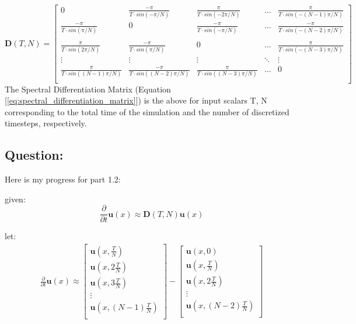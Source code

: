 \documentclass{article}
\begin{document}
\begin{equation}
    \textbf{D}(T,N) = \begin{bmatrix}
       0 & \frac{-\pi}{T \cdot sin(-\pi/ N)} & \frac{\pi}{T \cdot sin(-2\pi/ N)} & \hdots & \frac{\pi}{T \cdot sin(-(N-1)\pi/ N)}\\
       \frac{-\pi}{T \cdot sin(\pi/ N)} & 0 & \frac{-\pi}{T \cdot sin(-\pi/ N)} & \hdots & \frac{-\pi}{T \cdot sin(-(N-2)\pi/ N)}\\\\
       \frac{\pi}{T \cdot sin(2\pi/ N)} & \frac{-\pi}{T \cdot sin(\pi/ N)} & 0 & \hdots & \frac{\pi}{T \cdot sin(-(N-3)\pi/ N)} \\
       \vdots & \vdots & \vdots & \ddots & \vdots \\
       \frac{\pi}{T \cdot sin((N-1)\pi/ N)} & \frac{-\pi}{T \cdot sin((N-2)\pi/ N)} & \frac{\pi}{T \cdot sin((N-3)\pi/ N)} & \hdots & 0\\
   \end{bmatrix}
   \label{eq:spectral_differentiation_matrix}
\end{equation}
The Spectral Differentiation Matrix (Equation [\ref{eq:spectral_differentiation_matrix}]) is the above for input scalars T, N corresponding to the total time of the simulation and the number of discretized timesteps, respectively.

\subsection{Question:}

Here is my progress for part 1.2:  

given:
$$\frac{\partial}{\partial t}\textbf{u}(x) \approx \textbf{D}(T,N)\textbf{u}(x)$$

let:
\begin{align*}
\frac{\partial}{\partial t}\textbf{u}(x)
\approx \begin{bmatrix}
       \textbf{u}(x,\frac{T}{N}) \\
       \textbf{u}(x,2\frac{T}{N}) \\
       \textbf{u}(x,3\frac{T}{N}) \\
       \vdots \\
       \textbf{u}(x,(N-1)\frac{T}{N}) \\
   \end{bmatrix}
   - \begin{bmatrix}
       \textbf{u}(x,0) \\
       \textbf{u}(x,\frac{T}{N}) \\
       \textbf{u}(x,2\frac{T}{N}) \\
       \vdots \\
       \textbf{u}(x,(N-2)\frac{T}{N}) \\
   \end{bmatrix}
   \end{align*}
\end{document}
